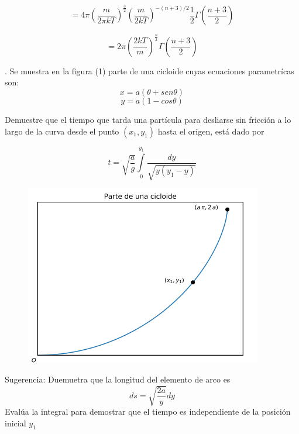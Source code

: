 \documentclass[12pt,a4paper]{article}
\begin{document}
\begin{equation*}
    = 4 \pi (\frac{m}{2 \pi k T})^{\frac{3}{2}} (\frac{m}{2kT}) ^{-(n+3)/2} \frac{1}{2} \Gamma(\frac{n+3}{2})
\end{equation*}

\begin{equation*}
    = 2 \pi (\frac{2kT}{m})^{\frac{n}{2}} \Gamma (\frac{n+3}{2})
\end{equation*}











\newpage
{}. Se muestra en la figura (1) parte de una cicloide cuyas ecuaciones parametrícas son:
\begin{equation*}
    x = a(\theta + sen\theta)
\end{equation*}
\begin{equation*}
    y = a(1 - cos \theta    )
\end{equation*}

\noindent Demuestre que el tiempo que tarda una partícula para desliarse sin fricción a lo largo de la curva desde el punto $(x_1, y_1)$ hasta el origen, está dado por

\begin{equation*}
    t = \sqrt{\frac{a}{g}} \int \limits_{0}^{y_1} \frac{dy}{\sqrt{y(y_1 - y)}}
\end{equation*}

\begin{figure}[h!]
    \centering
    \includegraphics{Ejercicios_Tema_01_Semana_03.pdf - Google Chrome 22_03_2021 01_34_00 p. m. (2).png}
    \caption{}
\end{figure}
\noindent Sugerencia: Duemuetra que la longitud del elemento de arco es
\begin{equation*}
    ds = \sqrt{\frac{2a}{y}} dy
\end{equation*}
Evalúa la integral para demostrar que el tiempo es independiente de la posición inicial $y_1$
\end{document}
